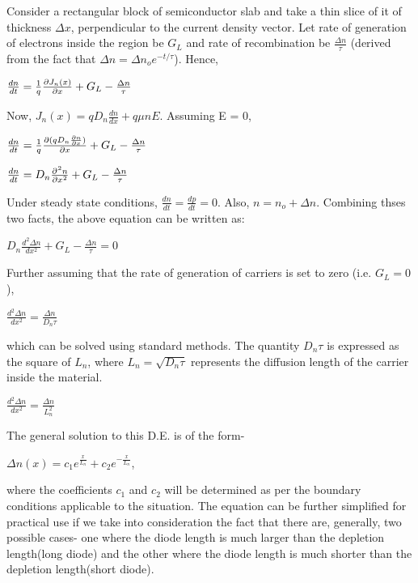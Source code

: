 \documentclass[12 pt]{article}
\begin{document}
Consider a rectangular block of semiconductor slab and take a thin slice of it of thickness $\Delta x$, perpendicular to the current density vector. Let rate of generation of electrons inside the region be $G_{L}$ and rate of recombination be $\frac{\Delta n}{\tau}$ (derived from the fact that $\Delta n= \Delta n_{o}e^{-t/\tau}$). Hence,

\begin{center}
    $ \frac{dn}{dt} = \frac{1}{q}\diffp{J_{n}(x)}{x} + G_{L} - \frac{\Delta n}{\tau} $
\end{center}

Now, $J_{n}(x) = qD_{n}\frac{dn}{dx} + q\mu nE$. Assuming E = 0,
\begin{center}
    $ \frac{dn}{dt} = \frac{1}{q}\diffp{(qD_{n}\diffp{n}{x})}{x} + G_{L} - \frac{\Delta n}{\tau}  $
\end{center}
\begin{center}
    $ \frac{dn}{dt} = D_{n}\diffp[2]nx + G_{L} - \frac{\Delta n}{\tau}   $
\end{center}
Under steady state conditions, $\frac{dn}{dt} = \frac{dp}{dt} = 0$. Also, $n = n_{o} + \Delta n$. Combining thses two facts, the above equation can be written as: 
\begin{center}
    $ D_{n}\frac{d^{2}\Delta n}{dx^{2}} + G_{L} - \frac{\Delta n}{\tau} = 0 $
\end{center}
Further assuming that the rate of generation of carriers is set to zero (i.e. $G_{L} = 0$),
\begin{center}
    $ \frac{d^{2}\Delta n}{dx^{2}} = \frac{\Delta n}{D_{n}\tau}  $
\end{center}
which can be solved using standard methods. The quantity $D_{n}\tau$ is expressed as the square of $L_{n}$, where $L_{n} = \sqrt{D_{n}\tau}$ represents the diffusion length of the carrier inside the material.\par
\begin{center}
    $ \frac{d^{2}\Delta n}{dx^{2}} = \frac{\Delta n}{L_{n}^{2}} $
\end{center}
The general solution to this D.E. is of the form-
\begin{center}
    $ \Delta n(x) = c_{1}e^{\frac{x}{L_{n}}}+c_{2}e^{-\frac{x}{L_{n}}} $,
\end{center}
where the coefficients $c_{1}$ and $c_{2}$ will be determined as per the boundary conditions applicable to the situation. The equation can be further simplified for practical use if we take into consideration the fact that there are, generally, two possible cases- one where the diode length is much larger than the depletion length(long diode) and the other where the diode length is much shorter than the depletion length(short diode).\par
\end{document}
